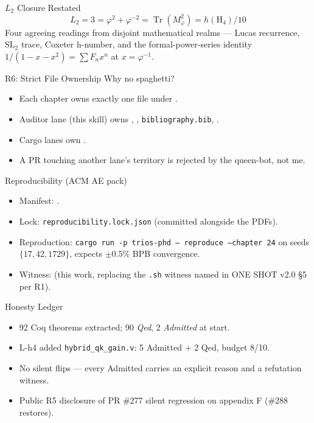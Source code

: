 \documentclass[10pt,aspectratio=169]{beamer}
\begin{document}
\begin{frame}{$L_{2}$ Closure Restated}
  \[
    \boxed{\;L_{2}=3=\varphi^{2}+\varphi^{-2}=\operatorname{Tr}(M_{\varphi}^{2})=h(\mathrm{H}_{4})/10\;}
  \]
  Four agreeing readings from disjoint mathematical realms — Lucas
  recurrence, $\mathrm{SL}_{2}$ trace, Coxeter h-number, and the
  formal-power-series identity $1/(1-x-x^{2})=\sum F_{n}x^{n}$ at $x=\varphi^{-1}$.
\end{frame}

\begin{frame}{R6: Strict File Ownership}
  Why no spaghetti?
  \begin{itemize}
    \item Each chapter owns exactly one file under .
    \item Auditor lane (this skill) owns , , \texttt{bibliography.bib}, .
    \item Cargo lanes own .
    \item A PR touching another lane's territory is rejected by the queen-bot, not me.
  \end{itemize}
\end{frame}

\begin{frame}{Reproducibility (ACM AE pack)}
  \begin{itemize}
    \item Manifest: .
    \item Lock: \texttt{reproducibility.lock.json} (committed alongside the PDFs).
    \item Reproduction: \texttt{cargo run -p trios-phd -- reproduce --chapter 24} on seeds $\{17, 42, 1729\}$, expects $\pm 0{.}5\%$ BPB convergence.
    \item Witness:  (this work, replacing the \texttt{.sh} witness named in ONE SHOT v2.0 §5 per R1).
  \end{itemize}
\end{frame}

\begin{frame}{Honesty Ledger}
  \begin{itemize}
    \item 92 Coq theorems extracted; 90 \emph{Qed}, 2 \emph{Admitted} at start.
    \item L-h4 added \texttt{hybrid\_qk\_gain.v}: 5 Admitted + 2 Qed, budget 8/10.
    \item No silent flips — every Admitted carries an explicit reason and a refutation witness.
    \item Public R5 disclosure of PR \#277 silent regression on appendix F (\#288 restores).
  \end{itemize}
\end{frame}
\end{document}
